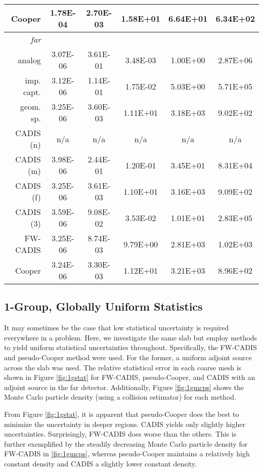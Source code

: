 \begin{table*}[!]
\begin{center}
{\begin{tabular*}{0.90\textwidth}{@{\extracolsep{\fill}} rccccc }
   Cooper      & 1.78E-04 & 2.70E-03 & 1.58E+01 & 6.64E+01 & 6.34E+02 \\
  \midrule 
   \emph{ far}   &  & & & & \\
  \midrule
   analog      & 3.07E-06 & 3.61E-01 & 3.48E-03 & 1.00E+00 & 2.87E+06 \\
   imp. capt.  & 3.12E-06 & 1.14E-01 & 1.75E-02 & 5.03E+00 & 5.71E+05 \\
   geom. sp.   & 3.25E-06 & 3.60E-03 & 1.11E+01 & 3.18E+03 & 9.02E+02 \\
   CADIS (n)   &      n/a &      n/a &      n/a &      n/a &  n/a     \\
   CADIS (m)   & 3.98E-06 & 2.44E-01 & 1.20E-01 & 3.45E+01 & 8.31E+04 \\
   CADIS (f)   & 3.25E-06 & 3.61E-03 & 1.10E+01 & 3.16E+03 & 9.09E+02 \\
   CADIS (3)   & 3.59E-06 & 9.08E-02 & 3.53E-02 & 1.01E+01 & 2.83E+05 \\
   FW-CADIS    & 3.25E-06 & 8.74E-03 & 9.79E+00 & 2.81E+03 & 1.02E+03 \\
   Cooper      & 3.24E-06 & 3.30E-03 & 1.12E+01 & 3.21E+03 & 8.96E+02 \\
  \bottomrule 
 \end{tabular*} 
 }
 \end{center} 
 \label{tbl:1g3d}  
\end{table*}


\subsection{1-Group, Globally Uniform Statistics}

It may sometimes be the case that low statistical uncertainty is required
everywhere in a problem.  Here, we investigate the same slab but employ methods
to yield  uniform statistical uncertainties throughout.  Specifically, the
FW-CADIS and pseudo-Cooper method were used.  For the former, a uniform adjoint
source across the slab was used.  The relative statistical error in each coarse
mesh is shown in Figure \ref{fig:1gstat} for FW-CADIS, pseudo-Cooper, and CADIS
with an adjoint source in the far detector.  Additionally, Figure
\ref{fig:1gmcps} shows the Monte Carlo particle density (using a collision
estimator) for each method.  

From Figure \ref{fig:1gstat}, it is apparent that pseudo-Cooper does the best to
minimize the uncertainty in deeper regions.  CADIS yields only slightly higher
uncertainties.  Surprisingly, FW-CADIS does worse than the others.  This is
further exemplified by the steadily decreasing Monte Carlo particle density for
FW-CADIS in \ref{fig:1gmcps}, whereas pseudo-Cooper maintains a relatively high
constant density and CADIS a slightly lower constant density.

